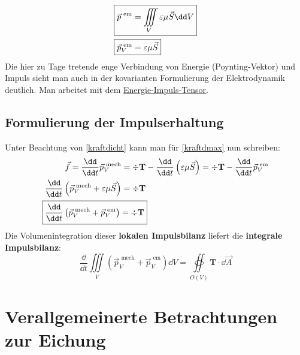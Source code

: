 		        \begin{align}
			       \Aboxed{ \vec{p}^\text{ em}   & = \iiint\limits_V \varepsilon\mu\vec{S} \dd V }\\
			        \Aboxed{\vec{p}^\text{ em}_V & = \varepsilon\mu\vec{S}} \label{impdicht}
		        \end{align}
Die hier zu Tage tretende enge Verbindung von Energie (Poynting-Vektor) und Impuls sieht man auch in der kovarianten Formulierung der Elektrodynamik deutlich. Man arbeitet mit dem \href{https://en.wikipedia.org/wiki/Covariant_formulation_of_classical_electromagnetism#Electromagnetic_stress%E2%80%93energy_tensor}{Energie-Impuls-Tensor}. 
  \subsection{Formulierung der Impulserhaltung}
		  Unter Beachtung von \ref{kraftdicht} kann man für \ref{kraftdmax} nun schreiben:
		        \begin{align}
			        \vec{f}= \frac{\dd }{\dd t}\vec{p}^\text{ mech}_V                              & = \div \mathbf{T} - \frac{\dd }{\dd t}\left( \varepsilon\mu\vec{S}\right) = \div \mathbf{T} - \frac{\dd }{\dd t}\vec{p}^\text{ em}_V \nonumber \\
			        \frac{\dd }{\dd t}\left(\vec{p}^\text{ mech}_V +  \varepsilon\mu\vec{S}\right) & =\div \mathbf{T}                                                                                                                     \nonumber\\
			        \Aboxed{\frac{\dd }{\dd t}\left(\vec{p}^\text{ mech}_V + \vec{p}^\text{ em}_V\right)   & =\div \mathbf{T}}
		        \end{align}
		   Die Volumenintegration dieser \textbf{lokalen Impulsbilanz} liefert die \textbf{integrale Impulsbilanz}:
		        \begin{equation}
			        \boxed{\frac{\dd }{\dd t} \iiint\limits_V \left(\vec{p}^\text{ mech}_V + \vec{p}^\text{ em}_V\right)\dd V = \oiint\limits_{O(V)}\mathbf{T} \cdot \dd \vec{A}}
		        \end{equation}
\section{Verallgemeinerte Betrachtungen zur Eichung}\label{geneich}
